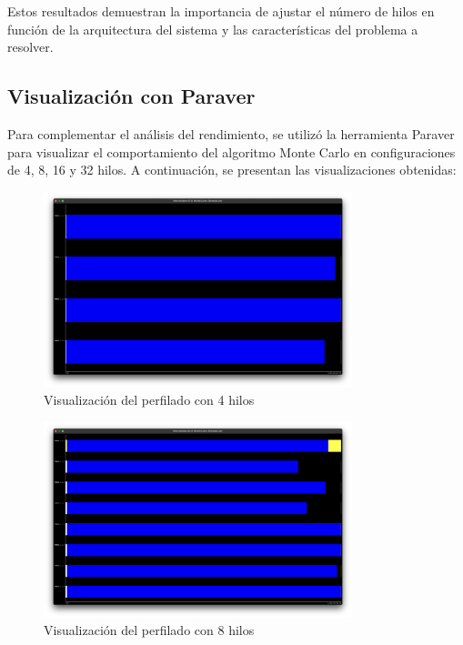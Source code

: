 \documentclass[a4paper, 10pt, onecolumn]{IEEEtran}
\begin{document}
Estos resultados demuestran la importancia de ajustar el número de hilos en función de la arquitectura del sistema y las características del problema a resolver.

\subsection{Visualización con Paraver}

Para complementar el análisis del rendimiento, se utilizó la herramienta Paraver para visualizar el comportamiento del algoritmo Monte Carlo en configuraciones de 4, 8, 16 y 32 hilos. A continuación, se presentan las visualizaciones obtenidas:

\begin{figure}[H]
  \centering
  \includegraphics[width=0.8\textwidth]{./img/paraver-4threads.png}
  \caption{Visualización del perfilado con 4 hilos}
  \label{fig:paraver_4threads}
\end{figure}

\begin{figure}[H]
  \centering
  \includegraphics[width=0.8\textwidth]{./img/paraver-8threads.png}
  \caption{Visualización del perfilado con 8 hilos}
  \label{fig:paraver_8threads}
\end{figure}
\end{document}
